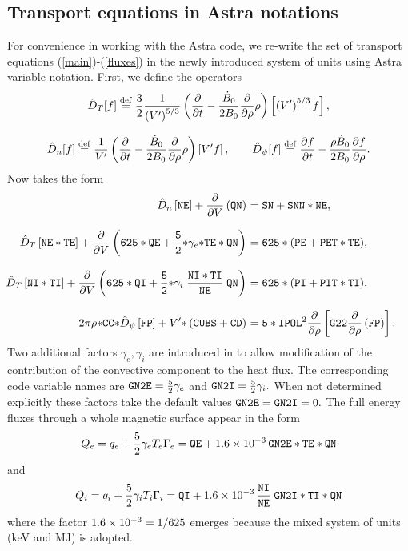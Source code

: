 \subsection{Transport equations in Astra notations}

For convenience in working with the Astra code, we re-write the set of
transport equations (\ref{main})-(\ref{fluxes}) in the newly introduced
system of units using Astra variable notation. First, we define
the operators 
\begin{equation}
\begin{array}{c}
\hat D_T[f]\df\dstyle
\frac{3}{2}\frac{1}{\lb(V'\rb)^{5/3}}
\lb(\prti{}{t}-\frac{\dot B_0}{2B_0}\prti{}{\rho}\rho\rb)
\lb[\lb(V'\rb)^{5/3}f\rb]
,\bigskip\\ \dstyle
\hat D_n[f]\df
\frac{1}{V'}\lb(\prti{}{t}-\frac{\dot B_0}{2B_0}\prti{}{\rho}\rho\rb)
\lb[V'f\rb]
,\qquad\dstyle
\hat D_\psi[f]\df
\prti{f}{t}-\frac{\rho\dot B_0}{2B_0}\prti{f}{\rho}
.\end{array}
\end{equation}
Now  takes the form
\begin{equation}\label{Amain}
\hspace*{-5mm}
\begin{array}{rl}\dstyle
\hat D_n\left[{\tt NE}\right]+\prti{}{V}\lb({\tt QN}\rb)
&\!\!\!\!
={\tt SN}+{\tt SNN*NE}
,\bigskip\\ \dstyle
\hat D_T\left[{\tt NE*TE}\right]
+\prti{}{V}
\lb({\tt 625*QE}+\frac{\tt 5}{\tt 2}{\tt *}\gamma_e{\tt *TE*QN}\rb)
&\!\!\!\!
={\tt 625*(PE+PET*TE)}
,\bigskip\\ \dstyle
\hat D_T\left[{\tt NI*TI}\right]
+\prti{}{V}
\lb({\tt 625*QI}+\frac{\tt 5}{\tt 2}{\tt*}\gamma_i\;
\frac{\tt NI*TI}{\tt NE}\;{\tt QN}\rb)
&\!\!\!\!
={\tt 625*(PI+PIT*TI)}
,\bigskip\\ \dstyle
{2\pi\rho}{\tt *CC*}\hat D_\psi\lb[{\tt FP}\rb]
+V'{\tt *}\left({\tt CUBS}+{\tt CD}\right)
&\!\!\!\!\dstyle
={\tt 5*IPOL}^2\prti{}{\rho}
\left[{\tt G22}\prti{}{\rho}\lb(\tt FP\rb)\right]
.\end{array}
\end{equation}
Two additional factors $\gamma_e,\gamma_i$ are introduced in 
to allow modification of the contribution of the convective component to
the heat flux. 
The corresponding code variable names are
${\tt GN2E}=\frac{5}{2}\gamma_e$ and ${\tt GN2I}=\frac{5}{2}\gamma_i.$
When not determined explicitly these factors take the default values 
${\tt GN2E}={\tt GN2I}=0.$ 
The full energy fluxes through a whole magnetic surface appear in the
form 
\begin{equation}
Q_e=q_e+\frac{5}{2}\gamma_e T_e \Gamma_e
={\tt QE}+1.6\times10^{-3}\,{\tt GN2E*TE*QN}
\end{equation}
and
\begin{equation}
Q_i=q_i+\frac{5}{2}\gamma_i T_i \Gamma_i
={\tt QI}+1.6\times10^{-3}\,\frac{\tt NI}{\tt NE}\;{\tt GN2I*TI*QN}
\end{equation}
where the factor $1.6\times10^{-3}=1/625$ emerges because the mixed system of units (keV and
MJ) is adopted. 

